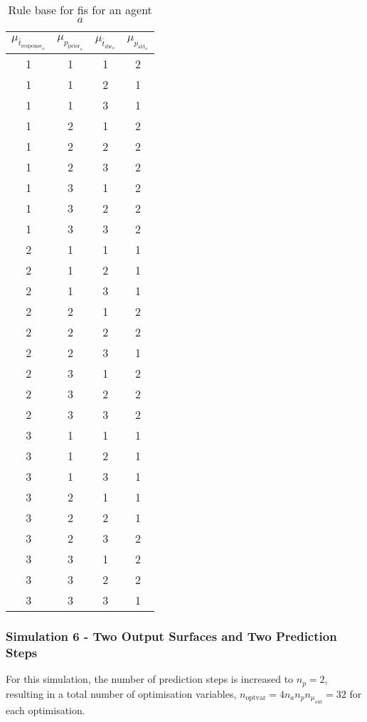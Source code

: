 \documentclass[conference]{IEEEtran}
\begin{document}
\begin{table}[]
    \centering
    \caption{Rule base for \gls{fis} for an agent $a$}
    \label{tab:fis_rulebase}
    \begin{tabular}{cccc}
    \toprule
        $\mu_{\bar{t}_{\text{response}_{a}}}$ & $\mu_{p_{\text{prior}_{a}}}$ & $\mu_{\bar{t}_{\text{dw}_{a}}}$ & $\mu_{p_{\text{att}_{a}}}$ \\    
    \midrule
        1 & 1 & 1 & 2 \\
        1 & 1 & 2 & 1 \\
        1 & 1 & 3 & 1 \\
        1 & 2 & 1 & 2 \\
        1 & 2 & 2 & 2 \\
        1 & 2 & 3 & 2 \\
        1 & 3 & 1 & 2 \\
        1 & 3 & 2 & 2 \\
        1 & 3 & 3 & 2 \\
        2 & 1 & 1 & 1 \\
        2 & 1 & 2 & 1 \\
        2 & 1 & 3 & 1 \\
        2 & 2 & 1 & 2 \\
        2 & 2 & 2 & 2 \\
        2 & 2 & 3 & 1 \\
        2 & 3 & 1 & 2 \\
        2 & 3 & 2 & 2 \\
        2 & 3 & 3 & 2 \\
        3 & 1 & 1 & 1 \\
        3 & 1 & 2 & 1 \\
        3 & 1 & 3 & 1 \\
        3 & 2 & 1 & 1 \\
        3 & 2 & 2 & 1 \\
        3 & 2 & 3 & 2 \\
        3 & 3 & 1 & 2 \\
        3 & 3 & 2 & 2 \\
        3 & 3 & 3 & 1 \\
        \bottomrule
    \end{tabular}
\end{table}


\subsubsection{Simulation 6 - Two Output Surfaces and Two Prediction Steps} \label{subsubsec:SS06}
For this simulation, the number of prediction steps is increased to $n_{p} = 2$, resulting in a total number of optimisation variables, $n_{\text{optvar}} = 4 n_{a} n_{p} n_{\mu_{\text{out}}} = 32$ for each optimisation.
\end{document}
